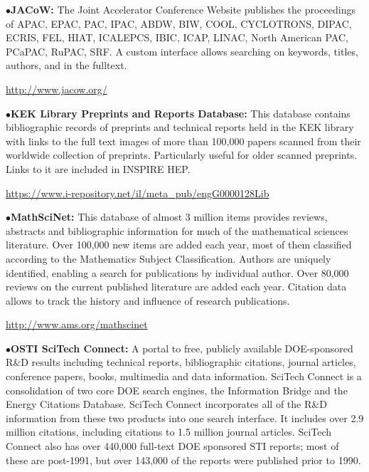 \item{$\bullet$}{\bf JACoW:}
The Joint Accelerator Conference Website publishes the proceedings of APAC, EPAC, PAC, IPAC, ABDW, BIW, COOL, CYCLOTRONS, DIPAC, ECRIS, FEL, HIAT, ICALEPCS, IBIC, ICAP, LINAC, North American PAC, PCaPAC, RuPAC, SRF. A custom interface allows searching on keywords, titles, authors, and in the fulltext.

   \item{}\qquad\url{http://www.jacow.org/}
\medskip

\item{$\bullet$}{\bf KEK Library Preprints and Reports Database:}
This database contains bibliographic records of preprints and technical reports held in the KEK library with links to the full text images of more than 100,000 papers scanned from their worldwide collection of preprints. Particularly useful for older scanned preprints. Links to it are included in INSPIRE HEP.
   \item{}\qquad\url{https://www.i-repository.net/il/meta_pub/engG0000128Lib}
\medskip

\item{$\bullet$}{\bf MathSciNet:}
This database of almost 3 million items provides reviews, abstracts and bibliographic information for much of the mathematical sciences literature. Over 100,000 new items are added each year, most of them classified according to the Mathematics Subject Classification. Authors are uniquely identified, enabling a search for publications by individual author. Over 80,000 reviews on the current published literature are added each year. Citation data allows to track the history and influence of research publications.
   \item{}\qquad\url{http://www.ams.org/mathscinet}
\medskip

\item{$\bullet$}{\bf OSTI SciTech Connect:}
A portal to free, publicly available DOE-sponsored R\&D results including technical reports, bibliographic citations, journal articles, conference papers, books, multimedia and data information. SciTech Connect is a consolidation of two core DOE search engines, the Information Bridge and the Energy Citations Database. SciTech Connect incorporates all of the R\&D information from these two products into one search interface. It includes over 2.9 million citations, including citations to 1.5 million journal articles. SciTech Connect also has over 440,000 full-text DOE sponsored STI reports; most of these are post-1991, but over 143,000 of the reports were published prior to 1990.


